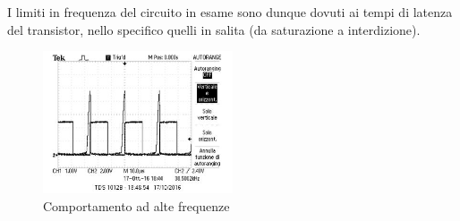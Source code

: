\documentclass[10pt,a4paper]{article}
\begin{document}
I limiti in frequenza del circuito in esame sono dunque dovuti ai tempi di latenza del transistor, nello specifico quelli in salita (da saturazione a interdizione).

\begin{figure}[t]
\centering
\includegraphics[width=0.5\textwidth]{../oscilloscopio/raise_problem.jpg}
\caption{Comportamento ad alte frequenze}
\end{figure}
\end{document}
